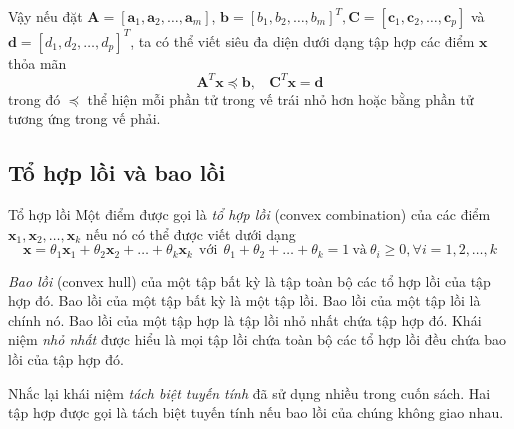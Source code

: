 Vậy nếu đặt $\mathbf{A} = [\mathbf{a}_1, \mathbf{a}_2, \dots, \mathbf{a}_m]$,
$\mathbf{b} = [b_1, b_2, \dots, b_m]^T, \mathbf{C} = [\mathbf{c}_1,
\mathbf{c}_2, \dots, \mathbf{c}_p]$ và $\mathbf{d} = [d_1, d_2, \dots, d_p]^T$, ta
có thể viết siêu đa diện dưới dạng tập hợp các điểm $\mathbf{x}$ thỏa mãn
\begin{equation*} 
 \mathbf{A}^T\mathbf{x} \preceq \mathbf{b}, ~~~~  \mathbf{C}^T\mathbf{x} = \mathbf{d} 
\end{equation*} 
trong đó $\preceq$ thể hiện mỗi phần tử trong vế trái nhỏ
hơn hoặc bằng phần tử tương ứng trong vế phải.
 

\subsection{Tổ hợp lồi và bao lồi}
\begin{mydef}{Tổ hợp lồi}{}
    Một điểm được gọi là \textit{tổ hợp lồi} ({convex combination}) của các
    điểm $\mathbf{x}_1, \mathbf{x}_2, \dots, \mathbf{x}_k$ nếu nó có thể được viết dưới dạng
    \begin{equation*} 
    \mathbf{x} = \theta_1 \mathbf{x}_1 + \theta_2 \mathbf{x}_2 + \dots  +
    \theta_k \mathbf{x}_k ~~ \text{với} ~~ \theta_1 + \theta_2 + \dots +
    \theta_k = 1 ~\text{và}~ \theta_i \geq 0, \forall i= 1, 2, \dots, k 
    \end{equation*} 
\end{mydef}

\textit{Bao lồi} ({{convex hull}}) của một {tập bất kỳ} là tập
toàn bộ các tổ hợp lồi của tập hợp đó.
Bao lồi của một tập bất kỳ là một tập lồi.
Bao lồi của một tập lồi là chính nó. Bao lồi của một tập hợp là tập lồi {nhỏ nhất} chứa tập
hợp đó. Khái niệm {\textit{nhỏ nhất}} được hiểu là mọi tập lồi chứa toàn bộ các tổ hợp lồi đều chứa bao lồi của tập hợp đó. 
 

Nhắc lại khái niệm \textit{tách biệt tuyến tính} đã sử dụng nhiều trong cuốn
sách. Hai tập hợp được gọi là tách biệt tuyến tính nếu bao lồi của chúng không giao nhau.

